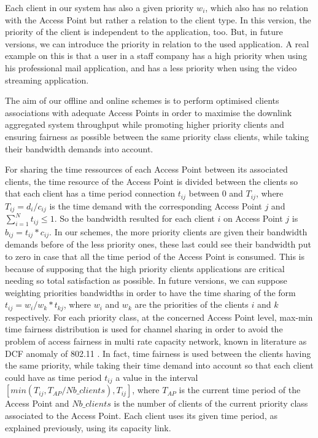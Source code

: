 \documentclass[journal,transmag]{IEEEtran}
\begin{document}
Each client in our system has also a given priority $w_{i}$, which also has no relation with the Access Point but rather a relation to the client type. In this version, the priority of the client is independent to the application, too. But, in future versions, we can introduce the priority in relation to the used application. A real example on this is that a user in a staff company has a high priority when using his professional mail application, and has a less priority when using the video streaming application. 

The aim of our offline and online schemes is to perform optimised clients associations with adequate Access Points in order to maximise the downlink aggregated system throughput while promoting higher priority clients and ensuring fairness as possible between the same priority class clients, while taking their bandwidth demands into account.

For sharing the time ressources of each Access Point between its associated clients, the time resource of the Access Point is divided between the clients so that each client has a time period connection $t_{ij}$ between 0 and $T_{ij}$, where $T_{ij}=d_i/c_{ij}$ is the time demand with the corresponding Access Point $j$ and $\sum_{i=1}^{N}t_{ij}\leq1$. So the bandwidth resulted for each client $i$ on Access Point $j$ is $b_{ij}=t_{ij} * c_{ij}$. 
In our schemes, the more priority clients are given their bandwidth demands before of the less priority ones, these last could see their bandwidth put to zero in case that all the time period of the Access Point is consumed. This is because of supposing that the high priority clients applications are critical needing so total satisfaction as possible. In future versions, we can suppose weighting priorities bandwidths in order to have the time sharing of the form $t_{ij}=w_i/w_k * t_{kj}$, where $w_i$ and $w_k$ are the priorities of the clients $i$ and $k$ respectively. 
For each priority class, at the concerned Access Point level, max-min time fairness distribution is used for channel sharing in order to avoid the problem of access fairness in multi rate capacity network, known in literature as DCF anomaly of 802.11 \cite{03performance_anomaly_DCF}. In fact, time fairness is used between the clients having the same priority, while taking their time demand into account so that each client could have as time period $t_{ij}$ a value in the interval $[min(T_{ij},T_{AP}/Nb\_clients),T_{ij}] $, where $T_{AP}$ is the current time period of the Access Point and $Nb\_clients$ is the number of clients of the current priority class associated to the Access Point. Each client uses its given time period, as explained previously, using its capacity link. 
\end{document}
